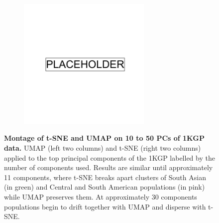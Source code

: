 \begin{figure}
    \centering
    \begin{subfigure}{0.95\textwidth}
    \includegraphics[width=0.7\textwidth]{placeholder.png}
    \end{subfigure}
    \caption[Montage of t-SNE and UMAP on 10 to 50 PCs of 1KGP data]{\textbf{Montage of t-SNE and UMAP on 10 to 50 PCs of 1KGP data.} UMAP (left two columns) and t-SNE (right two columns) applied to the top principal components of the 1KGP labelled by the number of components used. Results are similar until approximately 11 components, where t-SNE breaks apart clusters of South Asian (in green) and Central and South American populations (in pink) while UMAP preserves them. At approximately 30 components populations begin to drift together with UMAP and disperse with t-SNE.}
    \label{fig:supp_megamontage_pc10_50}
\end{figure}

\newpage

